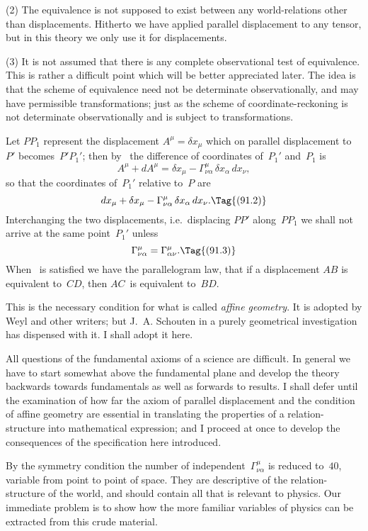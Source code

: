 \documentclass[12pt]{book}
\begin{document}
(2) The equivalence is not supposed to exist between any world-relations
other than displacements. Hitherto we have applied parallel displacement to
any tensor, but in this theory we only use it for displacements.

(3) It is not assumed that there is any complete observational test of
equivalence. This is rather a difficult point which will be better appreciated
later. The idea is that the scheme of equivalence need not be determinate
observationally, and may have permissible transformations; just as the scheme
of coordinate-reckoning is not determinate observationally and is subject to
transformations.

Let $PP_{1}$ represent the displacement $A^{\mu} = \delta x_{\mu}$ which on parallel displacement
to~$P'$ becomes~$P'P_{1}'$; then by~ the difference of coordinates of~$P_{1}'$
and~$P_{1}$ is
\[
A^{\mu} + dA^{\mu} = \delta x_{\mu} - \Gamma_{\nu\alpha}^{\mu}\, \delta x_{\alpha}\, dx_{\nu},
\]
so that the coordinates of~$P_{1}'$ relative to~$P$ are
\[
dx_{\mu} + \delta x_{\mu} - \Gamma_{\nu\alpha}^{\mu}\, \delta x_{\alpha}\, dx_{\nu}.
\Tag{(91.2)}
\]
Interchanging the two displacements, i.e.\ displacing $PP'$ along~$PP_{1}$ we shall
not arrive at the same point~$P_{1}'$ unless
\[
\Gamma_{\nu\alpha}^{\mu} = \Gamma_{\alpha\nu}^{\mu}.
\Tag{(91.3)}
\]
When ~is satisfied we have the parallelogram law, that if a displacement
$AB$ is equivalent to~$CD$, then $AC$~is equivalent to~$BD$.

This is the necessary condition for what is called \emph{affine geometry}. It is
%
%
adopted by Weyl and other writers; but J.~A. Schouten in a purely geometrical
investigation has dispensed with it. I shall adopt it here.

All questions of the fundamental axioms of a science are difficult. In
general we have to start somewhat above the fundamental plane and develop
the theory backwards towards fundamentals as well as forwards to results. I
shall defer until  the examination of how far the axiom of parallel displacement
and the condition of affine geometry are essential in translating the
properties of a relation-structure into mathematical expression; and I proceed
at once to develop the consequences of the specification here introduced.

By the symmetry condition the number of independent~$\Gamma_{\nu\alpha}^{\mu}$ is reduced to~$40$,
variable from point to point of space. They are descriptive of the relation-structure
of the world, and should contain all that is relevant to physics. Our
immediate problem is to show how the more familiar variables of physics can
be extracted from this crude material.
\end{document}
